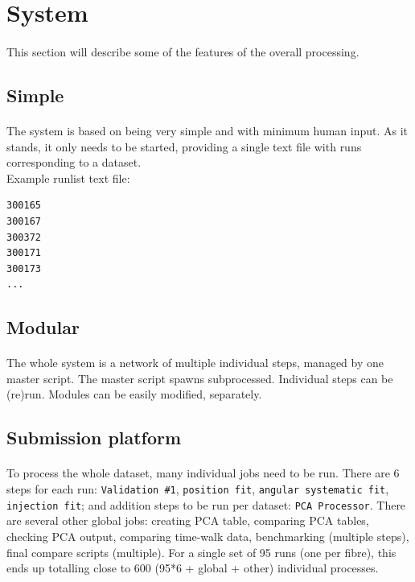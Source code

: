 \documentclass[12pt]{article}
\begin{document}
\clearpage

\section{System}
\paragraph{}
This section will describe some of the features of the overall processing.

\subsection{Simple}
\paragraph{}
The system is based on being very simple and with minimum human input. As it stands, it only needs to be started, providing a single text file with runs corresponding to a dataset.\\
Example runlist text file:
\begin{lstlisting}
300165
300167
300372
300171
300173
...
\end{lstlisting}

\subsection{Modular}
\paragraph{}
The whole system is a network of multiple individual steps, managed by one master script. The master script spawns subprocessed. Individual steps can be (re)run. Modules can be easily modified, separately.

\subsection{Submission platform}
\paragraph{}
To process the whole dataset, many individual jobs need to be run. There are 6 steps for each run: \texttt{Validation \#1}, \texttt{position fit}, \texttt{angular systematic fit}, \texttt{injection fit}; and addition steps to be run per dataset: \texttt{PCA Processor}. There are several other global jobs: creating PCA table, comparing PCA tables, checking PCA output, comparing time-walk data, benchmarking (multiple steps), final compare scripts (multiple). For a single set of 95 runs (one per fibre), this ends up totalling close to 600 (95*6 + global + other) individual processes.
\end{document}
